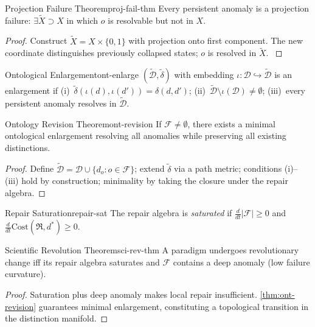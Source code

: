 \documentclass[12pt,twoside,openright]{book}
\newcommand{\repair}{\mathfrak{R}}
\begin{document}
\begin{theorem}{Projection Failure Theorem}{proj-fail-thm}
  Every persistent anomaly is a projection failure:
  $\exists\tilde{X}\supset X$ in which $o$ is resolvable
  but not in $X$.
\end{theorem}
\begin{proof}
  Construct $\tilde{X}=X\times\{0,1\}$ with projection
  onto first component. The new coordinate distinguishes
  previously collapsed states; $o$ is resolved in
  $\tilde{X}$. \parencite{kuhn1962structure}
\end{proof}

\begin{definition}{Ontological Enlargement}{ont-enlarge}
  $(\tilde{\mathcal{D}},\tilde\delta)$ with embedding
  $\iota:\mathcal{D}\hookrightarrow\tilde{\mathcal{D}}$ is
  an enlargement if (i)~$\tilde\delta(\iota(d),\iota(d'))
  =\delta(d,d')$; (ii)~$\tilde{\mathcal{D}}\setminus
  \iota(\mathcal{D})\ne\emptyset$;
  (iii)~every persistent anomaly resolves in
  $\tilde{\mathcal{D}}$.
\end{definition}

\begin{theorem}{Ontology Revision Theorem}{ont-revision}
  If $\mathcal{F}\ne\emptyset$, there exists a minimal
  ontological enlargement resolving all anomalies
  while preserving all existing distinctions.
\end{theorem}
\begin{proof}
  Define $\tilde{\mathcal{D}}=\mathcal{D}\cup
  \{d_o:o\in\mathcal{F}\}$; extend $\tilde\delta$ via
  a path metric; conditions (i)--(iii) hold by
  construction; minimality by taking the closure under
  the repair algebra.
\end{proof}

\begin{definition}{Repair Saturation}{repair-sat}
  The repair algebra is \emph{saturated} if
  $\frac{d}{dt}|\mathcal{F}|\ge0$ and
  $\frac{d}{dt}\mathrm{Cost}(\repair,d^*)\ge0$.
\end{definition}

\begin{theorem}{Scientific Revolution Theorem}{sci-rev-thm}
  A paradigm undergoes revolutionary change iff its repair
  algebra saturates and $\mathcal{F}$ contains a deep
  anomaly (low failure curvature).
  \parencite{kuhn1962structure,lakatos1978}
\end{theorem}
\begin{proof}
  Saturation plus deep anomaly makes local repair
  insufficient. \cref{thm:ont-revision} guarantees
  minimal enlargement, constituting a topological
  transition in the distinction manifold.
\end{proof}
\end{document}
